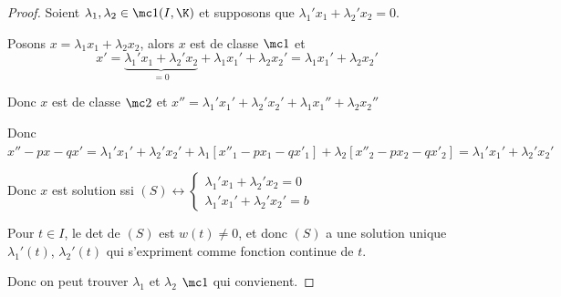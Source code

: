 \begin{proof}
    Soient $\lambda_1, \lambda_2 \in \mc 1(I, \K)$ et supposons que 
    $\lambda_1' x_1 + \lambda_2' x_2 = 0$. 

    Posons $x = \lambda_1 x_1 + \lambda_2 x_2$, alors $x$ est de classe $\mc 1$ et 
    $$x' = \underbrace{\lambda_1' x_1 + \lambda_2' x_2}_{ = 0} + \lambda_1 x_1' + \lambda_2 x_2' = \lambda_1 x_1' + \lambda_2 x_2'$$

    Donc $x$ est de classe $\mc 2$ et $x'' = \lambda_1' x_1' + \lambda_2' x_2' + \lambda_1 x_1'' + \lambda_2 x_2''$

    Donc $x'' - px - qx' = \lambda_1' x_1' + \lambda_2' x_2' + \lambda_1 [x''_1 - px_1 - qx'_1] + \lambda_2[x''_2 - px_2 - qx'_2] = \lambda_1' x_1' + \lambda_2' x_2' $

    Donc $x$ est solution ssi $(S) \leftrightarrow \begin{cases}
        \lambda_1' x_1 + \lambda_2' x_2 = 0 \\
        \lambda_1' x_1' + \lambda_2' x_2' = b
    \end{cases}$

    Pour $t \in I$, le det de $(S)$ est $w(t) \neq 0$, et donc $(S)$ a une solution unique 
    $\lambda_1'(t)$, $\lambda_2'(t)$ qui s'expriment comme fonction continue de $t$. 

    Donc on peut trouver $\lambda_1$ et $\lambda_2$ $\mc 1$ qui convienent.
\end{proof}

